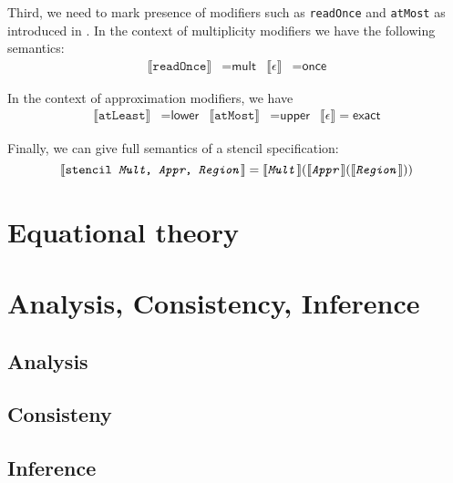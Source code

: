 \documentclass{article}
\theoremstyle{definition}
\theoremstyle{plain}
\newcommand{\interp}[1]{\llbracket\texttt{#1}\rrbracket}
\begin{document}
Third, we need to mark presence of modifiers such as \texttt{readOnce} and
\texttt{atMost} as introduced in \Cref{}. In the context of
multiplicity modifiers we have the following semantics:
%
\begin{align*}
  \interp{readOnce} & = \textsf{mult} &
  \llbracket\epsilon\rrbracket & = \textsf{once}
\end{align*}

In the context of approximation modifiers, we have
%
\begin{align*}
  \interp{atLeast} & = \textsf{lower} &
  \interp{atMost} & = \textsf{upper} &
  \llbracket \epsilon \rrbracket = \textsf{exact}
\end{align*}

Finally, we can give full semantics of a stencil specification:
%
\begin{equation*}
  \interp{stencil \textit{Mult}, \textit{Appr}, \textit{Region}} =
    \interp{\textit{Mult}}{(\interp{\textit{Appr}}(\interp{\textit{Region}}))}
\end{equation*}

\section{Equational theory}

\section{Analysis, Consistency, Inference}

\subsection{Analysis}

\subsection{Consisteny}

\subsection{Inference}
\end{document}
